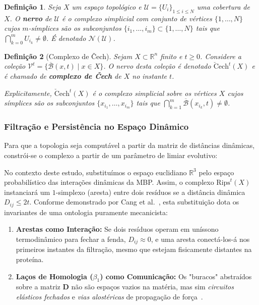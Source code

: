 \documentclass[12pt, a4paper]{article}
\newtheorem{definition}{Definição}
\begin{document}
\begin{definition}
Seja $X$ um espaço topológico e $\mathcal{U} = \{U_i\}_{1 \leq i \leq N}$ uma cobertura de $X$. O \textbf{nervo} de $\mathcal{U}$ é o complexo simplicial com conjunto de vértices $\{1, \ldots, N\}$ cujos $m$-símplices são os subconjuntos $\{i_1, \ldots, i_m\} \subset \{1, \ldots, N\}$ tais que $\bigcap_{k=0}^{m} U_{i_k} \neq \emptyset$. É denotado $\mathcal{N}(\mathcal{U})$.
\end{definition}

\begin{definition}[Complexo de \v{C}ech]
Sejam $X \subset \mathbb{R}^n$ finito e $t \geq 0$. Considere a coleção $\mathcal{V}^t = \{\overline{\mathcal{B}}(x,t) \mid x \in X\}$. O nervo desta coleção é denotado $\check{\mathrm{C}}\mathrm{ech}^t(X)$ e é chamado de \textbf{complexo de \v{C}ech} de $X$ no instante $t$.

Explicitamente, $\check{\mathrm{C}}\mathrm{ech}^t(X)$ é o complexo simplicial sobre os vértices $X$ cujos símplices são os subconjuntos $\{x_{i_1}, \ldots, x_{i_m}\}$ tais que $\bigcap_{k=1}^{m} \overline{\mathcal{B}}(x_{i_k}, t) \neq \emptyset$.
\end{definition}

\subsubsection{Filtração e Persistência no Espaço Dinâmico}

Para que a topologia seja computável a partir da matriz de distâncias dinâmicas, constrói-se o complexo a partir de um parâmetro de limiar evolutivo:

 

No contexto deste estudo, substituímos o espaço euclidiano $\mathbb{R}^3$ pelo espaço probabilístico das interações dinâmicas da MBP. Assim, o complexo $\mathrm{Rips}^t(X)$ instanciará um $1$-simplexo (aresta) entre dois resíduos se a distância dinâmica $D_{ij} \leq 2t$. Conforme demonstrado por Cang et al.~\cite{cang2015}, esta substituição dota os invariantes de uma ontologia puramente mecanicista:
\begin{enumerate}
    \item \textbf{Arestas como Interação:} Se dois resíduos operam em uníssono termodinâmico para fechar a fenda, $D_{ij} \approx 0$, e uma aresta conectá-los-á nos primeiros instantes da filtração, mesmo que estejam fisicamente distantes na proteína.
    \item \textbf{Laços de Homologia ($\beta_1$) como Comunicação:} Os "buracos" abstraídos sobre a matriz $\mathbf{D}$ não são espaços vazios na matéria, mas sim \textit{circuitos elásticos fechados} e \textit{vias alostéricas} de propagação de força~\cite{kovacev2016}.
\end{enumerate}
\end{document}
